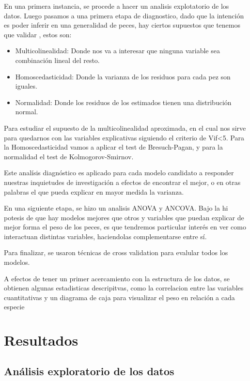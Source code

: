 \documentclass[
]{article}
\begin{document}
En una primera instancia, se procede a hacer un analisis explotatorio de
los datos. Luego pasamos a una primera etapa de diagnostico, dado que la
intención es poder inferir en una generalidad de peces, hay ciertos
supuestos que tenemos que validar , estos son:

\begin{itemize}
\item
  Multicolinealidad: Donde nos va a interesar que ninguna variable sea
  combinación lineal del resto.
\item
  Homoscedasticidad: Donde la varianza de los residuos para cada pez son
  iguales.
\item
  Normalidad: Donde los residuos de los estimados tienen una
  distribución normal.
\end{itemize}

Para estudiar el supuesto de la multicolinealidad aproximada, en el cual
nos sirve para quedarnos con las variables explicativas siguiendo el
criterio de Vif\textless5. Para la Homoscedasticidad vamos a aplicar el
test de Bresuch-Pagan, y para la normalidad el test de
Kolmogorov-Smirnov.

Este analísis diagnóstico es aplicado para cada modelo candidato a
responder nuestras inquietudes de investigación a efectos de encontrar
el mejor, o en otras palabras el que pueda explicar en mayor medida la
varianza.

En una siguiente etapa, se hizo un analisis ANOVA y ANCOVA. Bajo la hi
potesis de que hay modelos mejores que otros y variables que puedan
explicar de mejor forma el peso de los peces, es que tendremos
particular interés en ver como interactuan distintas variables,
haciendolas complementarse entre sí.

Para finalizar, se usaron técnicas de cross validation para evalular
todos los modelos.

A efectos de tener un primer acercamiento con la estructura de los
datos, se obtienen algunas estadisticas descripitvas, como la
correlacion entre las variables cuantitativas y un diagrama de caja para
visualizar el peso en relación a cada especie

\section{Resultados}\label{resultados}

\subsection{Análisis exploratorio de los
datos}\label{anuxe1lisis-exploratorio-de-los-datos}
\end{document}
